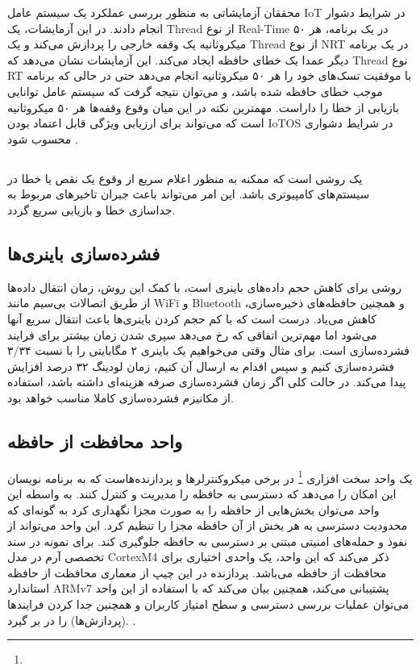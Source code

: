 \documentclass[10pt, a4paper]{article}
\begin{document}
محققان آزمایشاتی به منظور بررسی عملکرد یک سیستم عامل IoT در شرایط دشوار انجام
دادند. در این آزمایشات، یک Thread از نوع Real-Time در یک برنامه، هر ۵۰
میکروثانیه یک وقفه خارجی را پردازش می‌کند و یک Thread از نوع NRT در یک برنامه
دیگر عمدا یک خطای حافظه ایجاد می‌کند. این آزمایشات نشان می‌دهد که Thread نوع RT
با موفقیت تسک‌های خود را هر ۵۰ میکروثانیه انجام می‌دهد حتی در حالی که برنامه
موجب خطای حافظه شده باشد، و می‌توان نتیجه گرفت که سیستم عامل توانایی بازیابی از
خطا را داراست. مهمترین نکته در این میان وقوع وقفه‌ها هر ۵۰ میکروثانیه است که
می‌تواند برای ارزیابی ویژگی قابل اعتماد بودن IoTOS در شرایط دشواری محسوب شود
\cite{samsung21tizen}.

\subsection{}

یک روشی است که ممکنه به منظور اعلام سریع از وقوع یک نقص یا خطا در سیستم‌های
کامپیوتری باشد. این امر می‌تواند باعث جبران تاخیر‌های مربوط به جداسازی خطا و
بازیابی سریع گردد.

\subsection{فشرده‌سازی باینری‌ها}

روشی برای کاهش حجم داده‌های باینری است، با کمک این روش، زمان انتقال داده‌ها از
طریق اتصالات بی‌سیم مانند WiFi و Bluetooth و همچنین حافظه‌های ذخیره‌سازی، کاهش
می‌یاد. درست است که با کم حجم کردن باینری‌ها باعث انتقال سریع آنها می‌شود اما
مهم‌ترین اتفاقی که رخ می‌دهد سپری شدن زمان بیشتر برای فرایند فشرده‌سازی است.
برای مثال وقتی می‌خواهیم یک باینری ۲ مگابایتی را با نسبت ۳/۳۴ فشرده‌سازی کنیم و
سپس اقدام به ارسال آن کنیم، زمان لودینگ ۳۲ درصد افزایش پیدا می‌کند. در حالت کلی
اگر زمان فشرده‌سازی صرفه هزینه‌ای داشته باشد، استفاده از مکانیزم فشرده‌سازی
کاملا مناسب خواهد بود.

\subsection{واحد محافظت از حافظه}

یک واحد سخت افزاری \footnote{} در برخی میکروکنترلر‌ها
و پردازنده‌هاست که به برنامه نویسان این امکان را می‌دهد که دسترسی به حافظه را
مدیریت و کنترل کنند. به واسطه این واحد می‌توان بخش‌هایی از حافظه را به صورت مجزا
نگهداری کرد به گونه‌ای که محدودیت دسترسی به هر بخش‌ از آن حافظه مجزا را تنظیم
کرد. این واحد می‌تواند از نفوذ و حمله‌های امنیتی مبتنی بر دسترسی به حافظه
جلوگیری کند. برای نمونه در سند تخصصی آرم در مدل CortexM4 ذکر می‌کند که این واحد،
یک واحدی اختیاری برای محافظت از حافظه می‌باشد. پردازنده در این چیپ از معماری
محافظت از حافظه استاندارد ARMv7 پشتیبانی می‌کند، همچنین بیان می‌کند که با
استفاده از این واحد می‌توان عملیات بررسی دسترسی و سطح امتیاز کاربران و همچنین
جدا کردن فرایندها (پردازش‌ها) را در بر گیرد. \cite{cortexm4arm}.
\end{document}
